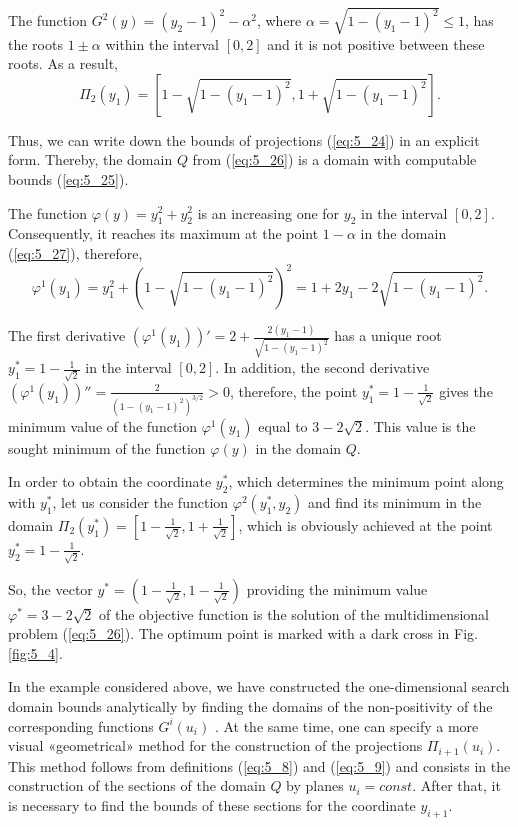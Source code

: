 \begin{example}
The function $G^2(y)=(y_2-1)^2-\alpha^2$, where $\alpha=\sqrt{1-(y_1-1)^2}\leq 1$,  has the roots $1\pm \alpha$ within the interval $[0,2]$ and  it is not positive between these roots. As a result, 
\begin{equation}
\label{eq:5_27}
\Pi_2(y_1)=[1-\sqrt{1-(y_1-1)^2},1+\sqrt{1-(y_1-1)^2}].
\end{equation}

Thus, we can write down the bounds of projections (\ref{eq:5_24}) in an explicit form. Thereby, the domain $Q$ from (\ref{eq:5_26}) is a domain with computable bounds (\ref{eq:5_25}).

The function $\varphi(y)=y_1^2+y_2^2$  is an increasing one for $y_2$  in the interval $[0,2]$. Consequently, it reaches its maximum at the point $1-\alpha$  in the domain (\ref{eq:5_27}), therefore,
\begin{displaymath}
\varphi^1(y_1)=y_1^2+(1-\sqrt{1-(y_1-1)^2})^2=1+2y_1-2\sqrt{1-(y_1-1)^2}.
\end{displaymath}

The first derivative $(\varphi^1(y_1))'=2+\frac{2(y_1-1)}{\sqrt{1-(y_1-1)^2}}$ has a unique root  $y_1^*=1-\frac{1}{\sqrt{2}}$ in the interval  $[0,2]$. 
In addition, the second derivative $(\varphi^1(y_1))''=\frac{2}{(1-(y_1-1)^2)^{3/2}}>0$, therefore, the point $y_1^*=1-\frac{1}{\sqrt{2}}$  gives the minimum value of the function $\varphi^1(y_1)$  equal to $3-2\sqrt{2}$. This value is the sought minimum of the function $\varphi(y)$ in the domain $Q$. 

In order to obtain the coordinate $y_2^*$, which determines the minimum point along with $y_1^*$, let us consider the function $\varphi^2(y_1^*,y_2)$ and find its minimum in the domain $\Pi_2(y_1^*)=[1-\frac{1}{\sqrt{2}},1+\frac{1}{\sqrt{2}}]$, which is obviously achieved at the point $y_2^*=1-\frac{1}{\sqrt{2}}$.

So, the vector $y^*=(1-\frac{1}{\sqrt{2}},1-\frac{1}{\sqrt{2}})$  providing the minimum value $\varphi^*=3-2\sqrt{2}$ of the objective function is the solution of the multidimensional problem (\ref{eq:5_26}). The optimum point is marked with a dark cross in Fig. \ref{fig:5_4}. 
\end{example}

In the example considered above, we have constructed the one-dimensional search domain bounds  analytically by finding the domains of the non-positivity of the corresponding functions $G^i(u_i)$ . At the same time, one can specify a more visual «geometrical» method for the construction of the projections $\Pi_{i+1}(u_i)$. This method follows from definitions (\ref{eq:5_8}) and (\ref{eq:5_9}) and consists in the construction of the sections of the domain $Q$  by planes $u_i=const$. After that, it is necessary to find the bounds of these sections for the coordinate $y_{i+1}$.

